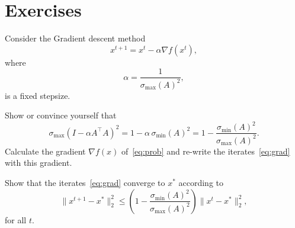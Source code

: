 \documentclass[11pt]{article}
\newcommand{\norm}[1]{\lVert#1\rVert}
\begin{document}
  \section{Exercises}
\begin{ExerciseList}
    \Exercise Consider the Gradient descent method 
    \begin{equation} \label{eq:grad}
    x^{t+1} = x^t - \alpha \nabla f(x^t),
    \end{equation}
    where  \begin{equation} \label{eq:alpha}
    \alpha = \frac{1}{\sigma_{\max}(A)^2},\end{equation}
     is a fixed stepsize.
    
    \ExePart \label{I}Show or convince yourself that 
    \begin{equation} \label{eq:spectral}
    \sigma_{\max}(I-\alpha  A^\top A)^2 = 1- \alpha\, \sigma_{\min}(A)^2 = 1- \frac{\sigma_{\min}(A)^2}{\sigma_{\max}(A)^2}.
    \end{equation}
    \ExePart \label{II}Calculate the gradient $\nabla f(x)$ of~\eqref{eq:prob} and re-write the iterates~\eqref{eq:grad} with this gradient.
     
    \ExePart \label{III} Show that the iterates~\eqref{eq:grad} converge to $x^*$ according to
    \[\norm{x^{t+1}-x^*}_2^2 \leq  \left(1- \frac{\sigma_{\min}(A)^2}{\sigma_{\max}(A)^2}\right) \norm{x^t -x^*}_2^2,\]
     for all $t.$ 


\end{ExerciseList}
\end{document}
